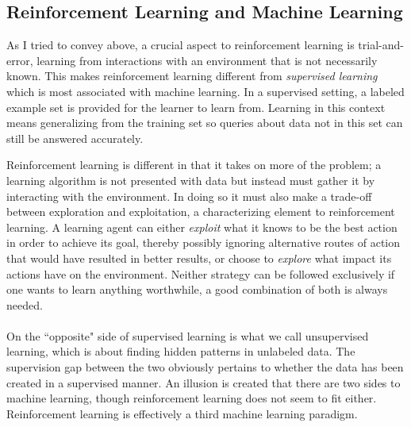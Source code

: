 \subsection{Reinforcement Learning and Machine Learning}
As I tried to convey above,
a crucial aspect to reinforcement learning
is trial-and-error, learning from interactions
with an environment that is not necessarily known.
This makes reinforcement learning different from
\textit{supervised learning}
which is most associated with machine learning.
In a supervised setting,
a labeled example set is provided
for the learner to learn from.
Learning in this context means generalizing from the training set
so queries about data not in this set
can still be answered accurately.

Reinforcement learning is different
in that it takes on more of the problem;
a learning algorithm is not presented with data
but instead must gather it by interacting with the environment.
In doing so it must also make a trade-off between exploration and exploitation,
a characterizing element to reinforcement learning.
A learning agent can either \textit{exploit}
what it knows to be the best action in order to achieve its goal,
thereby possibly ignoring alternative routes of action
that would have resulted in better results,
or choose to \textit{explore}
what impact its actions have on the environment.
Neither strategy can be followed exclusively
if one wants to learn anything worthwhile,
a good combination of both is always needed.

\paragraph{}
On the ``opposite" side of supervised learning
is what we call unsupervised learning,
which is about finding hidden patterns in unlabeled data.
The supervision gap between the two obviously pertains
to whether the data has been created in a supervised manner.
An illusion is created that there are two sides to machine learning,
though reinforcement learning does not seem to fit either.
Reinforcement learning is effectively a third machine learning paradigm.


